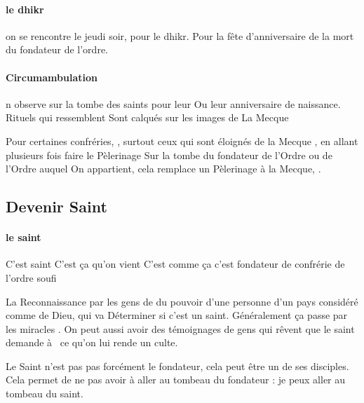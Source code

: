 \paragraph{le dhikr} on se rencontre le jeudi soir, pour le dhikr.  
Pour la fête d'anniversaire de la mort du fondateur de l'ordre.

\paragraph{Circumambulation} n observe sur la tombe des saints pour leur 
Ou leur anniversaire de naissance. Rituels qui  ressemblent 
Sont calqués sur les images de La Mecque 
  
Pour certaines 
confréries,  , surtout ceux qui  sont éloignés 
de la Mecque 
, en 
allant plusieurs fois faire le 
Pèlerinage 
Sur la tombe du fondateur de l'Ordre ou de l'Ordre auquel 
On appartient, cela remplace un 
Pèlerinage 
à  la Mecque,  . 

\subsection{Devenir Saint}

\paragraph{le saint} 
C'est saint  C'est ça qu'on vient 
C'est comme ça   c'est fondateur 
de confrérie 
de l'ordre soufi 

La Reconnaissance par les gens de du pouvoir d'une personne d'un pays considéré comme de Dieu, qui  va 
Déterminer si c'est un saint. Généralement ça passe par les miracles    . On peut aussi avoir des témoignages 
de gens qui  rêvent que le saint demande à  ce qu'on lui rende un culte.

Le Saint n'est pas pas forcément le fondateur, cela peut être un de ses disciples. Cela permet de ne pas avoir à aller au tombeau du fondateur : je peux aller au tombeau du saint. 



